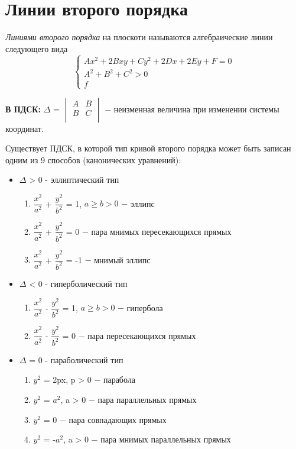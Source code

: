 \section{Линии второго порядка}

\begin{definition}
    \textit{Линиями второго порядка} на плоскоти называются алгебраические линии следующего вида
    \[
    \begin{cases}
        Ax^2 + 2Bxy + Cy^2 + 2Dx + 2Ey + F = 0\\
        A^2 + B^2 + C^2 > 0\\f
    \end{cases}
    \]
\end{definition}
\textbf{В ПДСК:} $\Delta$ = 
$\begin{vmatrix}
    A & B\\
    B & C\\
\end{vmatrix}
$ $-$ неизменная величина при изменении системы координат.\\

\begin{proposition}
    Существует ПДСК, в которой тип кривой второго порядка может быть записан одним из 9 способов (канонических уравнений):
    \begin{itemize}
        \item $\Delta$ > 0 - эллиптический тип
        \begin{enumerate}
            \item $\dfrac{x^2}{a^2}$ + $\dfrac{y^2}{b^2}$ = 1, $a\geq b>0$ $-$ эллипс
            \item $\dfrac{x^2}{a^2}$ + $\dfrac{y^2}{b^2}$ = 0 $-$ пара мнимых пересекающихся прямых
            \item $\dfrac{x^2}{a^2}$ + $\dfrac{y^2}{b^2}$ = -1 $-$ мнимый эллипс
        \end{enumerate}
        \item $\Delta$ < 0 - гиперболический тип
        \begin{enumerate}
            \item $\dfrac{x^2}{a^2}$ - $\dfrac{y^2}{b^2}$ = 1, $a\geq b>0$ $-$ гипербола
            \item $\dfrac{x^2}{a^2}$ - $\dfrac{y^2}{b^2}$ = 0 $-$ пара пересекающихся прямых
        \end{enumerate}
        \item $\Delta$ = 0 - параболический тип
        \begin{enumerate}
            \item $y^2$ = 2px, p > 0 $-$ парабола
            \item $y^2$ = $a^2$, a > 0 $-$ пара параллельных прямых
            \item $y^2$ = 0 $-$ пара совпадающих прямых
            \item $y^2$ = -$a^2$, a > 0 $-$ пара мнимых параллельных прямых
        \end{enumerate}
    \end{itemize}
\end{proposition}

